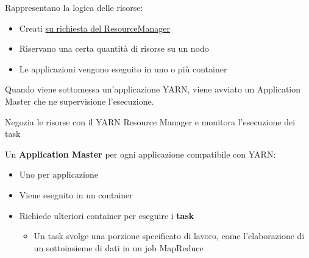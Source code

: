 Rappresentano la logica delle risorse:
\begin{itemize}
    \item Creati \underline{su richiesta del ResourceManager}
    \item Riservano una certa quantità di risorse su un nodo
    \item Le applicazioni vengono eseguito in uno o più container
\end{itemize}

Quando viene sottomessa un'applicazione YARN, viene avviato un Application Master che ne supervisione l'esecuzione.

Negozia le risorse con il YARN Resource Manager e monitora l'esecuzione dei task

Un \textbf{Application Master} per ogni applicazione compatibile con YARN:
\begin{itemize}
    \item Uno per applicazione
    \item Viene eseguito in un container
    \item Richiede ulteriori container per eseguire i \textbf{task}
    \begin{itemize}
        \item Un task svolge una porzione specificato di lavoro, come l'elaborazione di un sottoinsieme di dati in un job MapReduce
    \end{itemize}
\end{itemize}

